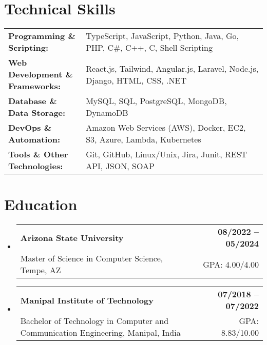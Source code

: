 \documentclass[letterpaper,11pt]{article}
\makeatletter
\newcommand{\educationSubheading}[4]{
  \vspace{-2pt}\item
    \begin{tabular*}{1.0\textwidth}[t]{l@{\extracolsep{\fill}}r}
      \textbf{\small #1} & \textbf{\small #2} \\
      {\small#3} & {\small #4} \\
    \end{tabular*}\vspace{-7pt}
}
\newcommand{\resumeSubHeadingListStart}{\begin{itemize}[leftmargin=0pt, label={}]}
\newcommand{\resumeSubHeadingListEnd}{\end{itemize}}
\makeatother
\begin{document}
\section{Technical Skills}
        \vspace{-14pt}
        \begin{table}[h]
            \footnotesize
            \begin{tabular}{p{0.3\linewidth} p{0.7\linewidth}}
                \textbf{Programming \& Scripting:} & TypeScript, JavaScript, Python, Java, Go, PHP, C\#, C++, C, Shell Scripting \\
                \textbf{Web Development \& Frameworks:} & React.js, Tailwind, Angular.js, Laravel, Node.js, Django, HTML, CSS, .NET \\
                \textbf{Database \& Data Storage:} & MySQL, SQL, PostgreSQL, MongoDB, DynamoDB \\
                \textbf{DevOps \& Automation:} & Amazon Web Services (AWS), Docker, EC2, S3, Azure, Lambda, Kubernetes \\
                \textbf{Tools \& Other Technologies:} & Git, GitHub, Linux/Unix, Jira, Junit, REST API, JSON, SOAP \\
            \end{tabular}
        \end{table}

 \vspace{-15pt}

\section{Education}
  \resumeSubHeadingListStart
    \educationSubheading
      {Arizona State University}{08/2022 -- 05/2024}
      {Master of Science in Computer Science, Tempe, AZ}{GPA: 4.00/4.00}

    \educationSubheading
      {Manipal Institute of Technology}{07/2018 -- 07/2022}
      {Bachelor of Technology in Computer and Communication Engineering, Manipal, India}{GPA: 8.83/10.00}
  \resumeSubHeadingListEnd
\end{document}
